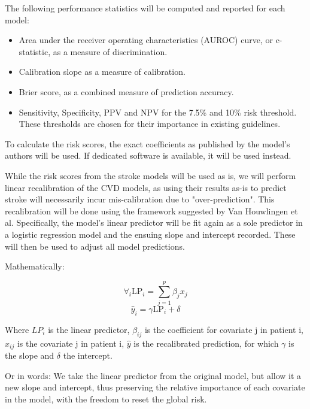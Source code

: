 \documentclass[a4paper,12pt]{article}
\begin{document}
		The following performance statistics will be computed and reported for each model\cite{Steyerberg2008,FrankE.Harrell2015}:
		
		\begin{itemize}
			\item Area under the receiver operating characteristics (AUROC) curve, or c-statistic, as a measure of discrimination.
			\item Calibration slope as a measure of calibration.
			\item Brier score, as a combined measure of prediction accuracy.
			\item Sensitivity, Specificity, PPV and NPV for the 7.5\% and 10\% risk threshold. These thresholds are chosen for their importance in existing guidelines\cite{Goff2014,Bibbins-Domingo2016}.
		\end{itemize}
		
		To calculate the risk scores, the exact coefficients as published by the model's authors will be used. If dedicated software is available, it will be used instead.
		
		While the risk scores from the stroke models will be used as is, we will perform linear recalibration of the CVD models, as using their results as-is to predict stroke will necessarily incur mis-calibration due to "over-prediction". This recalibration will be done using the framework suggested by Van Houwlingen et al\cite{Houwelingen2000}. Specifically, the model's linear predictor will be fit again as a sole predictor in a logistic regression model and the ensuing slope and intercept recorded. These will then be used to adjust all model predictions.
	
		Mathematically:
		
		\begin{equation*}
		\forall_i \text{LP}_i = \sum_{j=1}^{p}\beta_jx_j
		\end{equation*}
		\begin{equation*}
		\hat{y}_i = \gamma \text{LP}_i + \delta
		\end{equation*}
		
		Where $ LP_i $ is the linear predictor, $ \beta_{ij} $ is the coefficient for covariate j in patient i, $ x_{ij} $ is the covariate j in patient i, $ \hat{y} $ is the recalibrated prediction, for which $ \gamma $ is the slope and $ \delta $ the intercept.
		
		Or in words: We take the linear predictor from the original model, but allow it a new slope and intercept, thus preserving the relative importance of each covariate in the model, with the freedom to reset the global risk.
		
\end{document}
